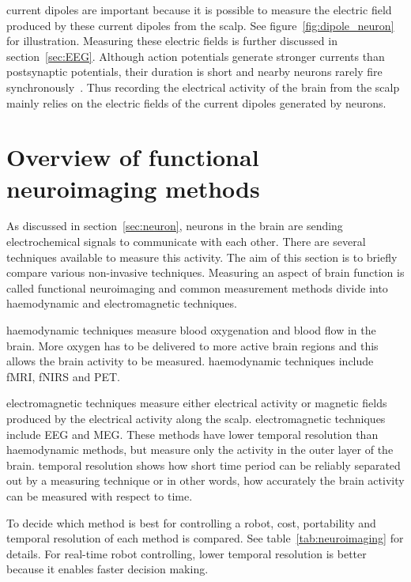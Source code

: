 \Glspl{current dipole} are important because it is possible to measure the electric field produced by these \glspl{current dipole} from the scalp. See figure~\ref{fig:dipole_neuron} for illustration. Measuring these electric fields is further discussed in section~\ref{sec:EEG}. Although \glspl{action potential} generate stronger currents than \glspl{postsynaptic potential}, their duration is short and nearby \glspl{neuron} rarely fire synchronously~\cite{electric_field}. Thus recording the electrical activity of the brain  from the scalp mainly relies on the electric fields of the \glspl{current dipole} generated by \glspl{neuron}.

\section{Overview of functional neuroimaging methods}
\label{sec:neuroimaging}

As discussed in section~\ref{sec:neuron}, \glspl{neuron} in the brain are sending electrochemical signals to communicate with each other. There are several techniques available to measure this activity. The aim of this section is to briefly compare various non-invasive techniques. Measuring an aspect of brain function is called \gls{functional neuroimaging} and common measurement methods divide into \gls{haemodynamic} and \gls{electromagnetic} techniques.

\Gls{haemodynamic} techniques measure blood oxygenation and blood flow in the brain. More oxygen has to be delivered to more active brain regions and this allows the brain activity to be measured. \Gls{haemodynamic} techniques include \gls{fMRI}, \gls{fNIRS} and \gls{PET}.

\Gls{electromagnetic} techniques measure either electrical activity or magnetic fields produced by the electrical activity along the scalp. \Gls{electromagnetic} techniques include \gls{EEG} and \gls{MEG}. These methods have lower \gls{temporal resolution} than \gls{haemodynamic} methods, but measure only the activity in the outer layer of the brain. \Gls{temporal resolution} shows how short time period can be reliably separated out by a measuring technique or in other words, how accurately the brain activity can be measured with respect to time.

To decide which method is best for controlling a robot, cost, portability and \gls{temporal resolution} of each method is compared. See table~\ref{tab:neuroimaging} for details. For real-time robot controlling, lower \gls{temporal resolution} is better because it enables faster decision making.

